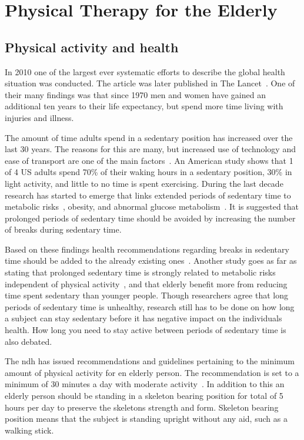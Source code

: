 \chapter{Physical Therapy for the Elderly}

\section{Physical activity and health}
In 2010 one of the largest ever systematic efforts to describe the global health situation was conducted. The article was later published in The Lancet~\cite{globalBurden}. One of their many findings was that since 1970 men and women have gained an additional ten years to their life expectancy, but spend more time living with injuries and illness. 

The amount of time adults spend in a sedentary position has increased over the last 30 years. The reasons for this are many, but increased use of technology and ease of transport are one of the main factors~\cite{sedentaryBehaviour}. An American study shows that 1 of 4 US adults spend 70\% of their waking hours in a sedentary position, 30\% in light activity, and little to no time is spent exercising. During the last decade research has started to emerge that links extended periods of sedentary time to metabolic risks~\cite{sedentaryTime}, obesity, and abnormal glucose metabolism~\cite{breaksSedentary}. It is suggested that prolonged periods of sedentary time should be avoided by increasing the number of breaks during sedentary time. 

Based on these findings health recommendations regarding breaks in sedentary time should be added to the already existing ones~\cite{breaksSedentary}. Another study goes as far as stating that prolonged sedentary time is strongly related to metabolic risks independent of physical activity~\cite{sedentaryActivity}, and that elderly benefit more from reducing time spent sedentary than younger people. Though researchers agree that long periods of sedentary time is unhealthy, research still has to be done on how long a subject can stay sedentary before it has negative impact on the individuals health. How long you need to stay active between periods of sedentary time is also debated.

The \gls{ndh} has issued recommendations and guidelines pertaining to the minimum amount of physical activity for en elderly person. The recommendation is set to a minimum of 30 minutes a day with moderate activity~\cite{helsedirektoratetFysiskAktivitet}. In addition to this an elderly person should be standing in a skeleton bearing position for total of 5 hours per day to preserve the skeletons strength and form. Skeleton bearing position means that the subject is standing upright without any aid, such as a walking stick.

